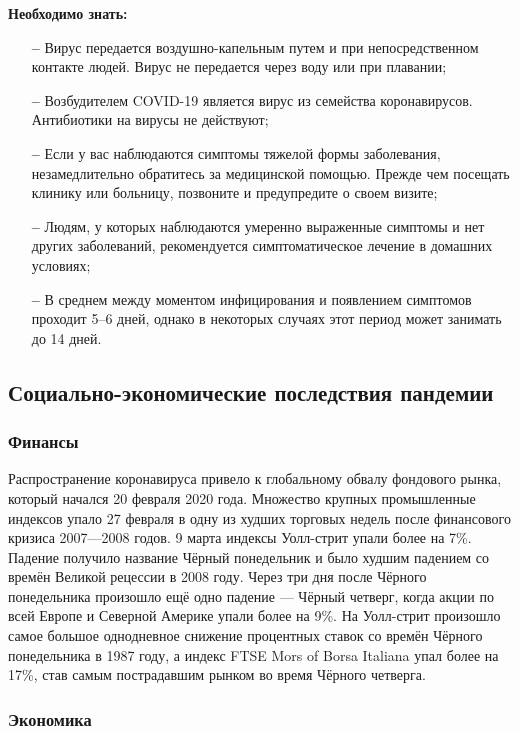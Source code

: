 \documentclass[a4paper, 12pt]{extarticle}
\begin{document}
\textbf{Необходимо знать:}
\begin{itemize}
    \item[\bfseries--] Вирус передается воздушно-капельным путем и при непосредственном
        контакте людей. Вирус не передается через воду или при плавании;
    \item[\bfseries--] Возбудителем COVID-19 является вирус из семейства коронавирусов.
        Антибиотики на вирусы не действуют;
    \item[\bfseries--] Если у вас наблюдаются симптомы тяжелой формы заболевания,
        незамедлительно обратитесь за медицинской помощью. Прежде чем посещать
        клинику или больницу, позвоните и предупредите о своем визите;
    \item[\bfseries--] Людям, у которых наблюдаются умеренно выраженные симптомы и нет
        других заболеваний, рекомендуется симптоматическое лечение в домашних
        условиях;
    \item[\bfseries--] В среднем между моментом инфицирования и появлением симптомов
        проходит 5–6 дней, однако в некоторых случаях этот период может
        занимать до 14 дней.
\end{itemize}
\newpage

\subsection{Социально-экономические последствия пандемии}
\subsubsection{Финансы}

Распространение коронавируса привело к глобальному обвалу фондового рынка,
который начался 20 февраля 2020 года. Множество крупных промышленные индексов
упало 27 февраля в одну из худших торговых недель после финансового кризиса
2007—2008 годов. 9 марта индексы Уолл-стрит упали более на 7\%. Падение
получило название Чёрный понедельник и было худшим падением со времён Великой
рецессии в 2008 году. Через три дня после Чёрного понедельника произошло ещё
одно падение — Чёрный четверг, когда акции по всей Европе и Северной Америке
упали более на 9\%. На Уолл-стрит произошло самое большое однодневное снижение
процентных ставок со времён Чёрного понедельника в 1987 году, а индекс FTSE
Mors of Borsa Italiana упал более на 17\%, став самым пострадавшим рынком во время Чёрного четверга.

\subsubsection{Экономика}
\end{document}
